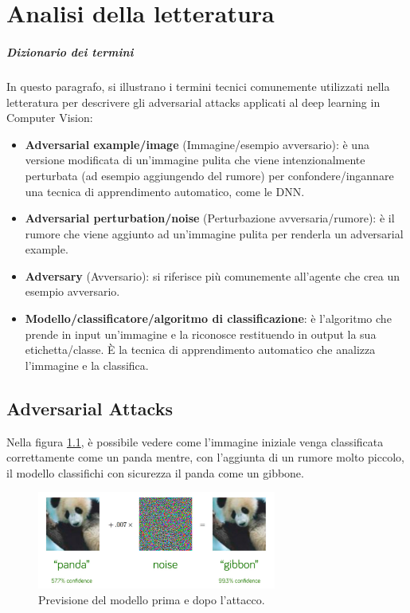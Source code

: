 \chapter{Analisi della letteratura}
\label{chap:2}

    \paragraph{Dizionario dei termini}
        In questo paragrafo, si illustrano i termini tecnici comunemente utilizzati nella letteratura per descrivere gli adversarial attacks applicati al deep learning in Computer Vision:
            \begin{itemize}
                \item \textbf{Adversarial example/image} (Immagine/esempio avversario): è una versione modificata di un'immagine pulita che viene intenzionalmente perturbata (ad esempio aggiungendo del rumore) per confondere/ingannare una tecnica di apprendimento automatico, come le DNN.
                \item \textbf{Adversarial perturbation/noise} (Perturbazione avversaria/rumore): è il rumore che viene aggiunto ad un'immagine pulita per renderla un adversarial example.
                \item \textbf{Adversary} (Avversario): si riferisce più comunemente all'agente che crea un esempio avversario.
                \item \textbf{Modello/classificatore/algoritmo di classificazione}: è l'algoritmo che prende in input un'immagine e la riconosce restituendo in output la sua etichetta/classe. È la tecnica di apprendimento automatico che analizza l'immagine e la classifica.
            \end{itemize}

\section{Adversarial Attacks}
Nella figura \ref{Panda}, è possibile vedere come l'immagine iniziale venga classificata correttamente come un panda mentre, con l'aggiunta di un rumore molto piccolo, il modello classifichi con sicurezza il panda come un gibbone.
    \begin{figure}[!h]
        \centering
        \includegraphics[width=0.7\textwidth]{Images/Panda.png}
        \caption{Previsione del modello prima e dopo l'attacco.}
        \label{Panda}
    \end{figure}

